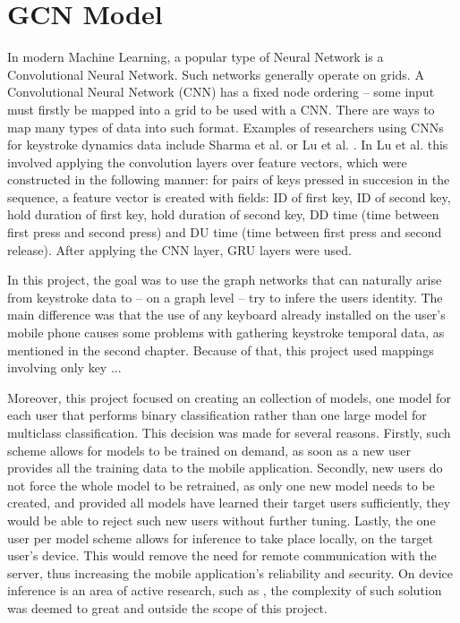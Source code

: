 \chapter{GCN Model}

In modern Machine Learning, a popular type of Neural Network is a Convolutional Neural Network. Such networks generally operate on grids. A Convolutional Neural Network (CNN) has a fixed node ordering -- some input must firstly be mapped into a grid to be used with a CNN. There are ways to map many types of data into such format. Examples of researchers using CNNs for keystroke dynamics data include Sharma et al. \cite{Shar2023} or Lu et al. \cite{Lu2020}. In Lu et al. this involved applying the convolution layers over feature vectors, which were constructed in the following manner: for pairs of keys pressed in succesion in the sequence, a feature vector is created with fields: ID of first key, ID of second key, hold duration of first key, hold duration of second key, DD time (time between first press and second press) and DU time (time between first press and second release). After applying the CNN layer, GRU layers were used.

In this project, the goal was to use the graph networks that can naturally arise from keystroke data to -- on a graph level -- try to infere the users identity. The main difference was that the use of any keyboard already installed on the user's mobile phone causes some problems with gathering keystroke temporal data, as mentioned in the second chapter. Because of that, this project used mappings involving only key ...

Moreover, this project focused on creating an collection of models, one model for each user that performs binary classification rather than one large model for multiclass classification. 
This decision was made for several reasons. Firstly, such scheme allows for models to be trained on demand, as soon as a new user provides all the training data to the mobile application. Secondly, new users do not force the whole model to be retrained, 
as only one new model needs to be created, and provided all models have learned their target users sufficiently, they would be able to reject such new users without further tuning. Lastly, the one user per model scheme allows for inference to take place locally, on the target user's device. This would remove the need for remote communication with the server, thus increasing the mobile application's reliability and security. On device inference is an area of active research, such as , the complexity of such solution was deemed to great and outside the scope of this project.
